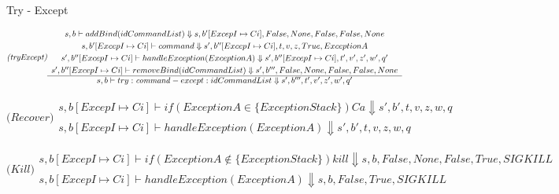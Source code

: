 \documentclass{llncs}
\newcommand{\tuple}[1]{\langle #1 \rangle}
\newcommand{\setof}[1]{\{ #1 \} }
\newcommand{\eval}[2]{\mathit{Eval}_{#1}(#2)}
\def\tr{\rhd}  %
\newcommand{\pfrule}[2]{\begin{array}{c} #1 \\ \hline #2 \end{array}}
\begin{document}
Try - Except


{\small $$
\textit{(tryExcept)}
\pfrule
{
{\small s,b \vdash addBind(idCommandList) \Downarrow s, b'[ExcepI \mapsto Ci], False, None, False, False, None}\\[1mm]
{\small s, b'[ExcepI \mapsto Ci] \vdash command \Downarrow s', b''[ExcepI \mapsto Ci], t, v, z, True, ExceptionA}\\[1mm]
{\small s', b''[ExcepI \mapsto Ci] \vdash handleException(ExceptionA) \Downarrow s', b''[ExcepI \mapsto Ci], t', v', z', w', q'}\\[1mm]
{\small s', b''[ExcepI \mapsto Ci] \vdash removeBind(idCommandList) \Downarrow s', b''',False, None, False, False, None}
}
{s,b \vdash try: \mathit{command} - except: idCommandList \Downarrow s', b''', t',v',z', w', q'}
{}
$$}




{\small $$
\textit{(Recover)}
\pfrule
{
s, b[ExcepI \mapsto Ci] \vdash if ( ExceptionA \in \{ExceptionStack\}) Ca \Downarrow s',b', t, v, z, w, q
}
{s,b[ExcepI \mapsto Ci] \vdash handleException(ExceptionA) \Downarrow s', b', t, v, z, w, q}
{}
$$}




{\small $$
\textit{(Kill)}
\pfrule
{
s, b[ExcepI \mapsto Ci] \vdash if ( ExceptionA \not \in \{ExceptionStack\}) kill \Downarrow s,b, False, None, False, True, SIGKILL
}
{s,b[ExcepI \mapsto Ci] \vdash handleException(ExceptionA) \Downarrow s, b, False, True, SIGKILL}
{}
$$}


%
%
\end{document}
